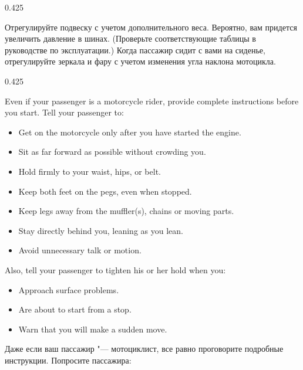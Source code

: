 \begin{langblock}{0.425}
\begin{rus}
		Отрегулируйте подвеску с учетом дополнительного веса. Вероятно, вам придется увеличить давление в шинах. (Проверьте соответствующие таблицы в руководстве по эксплуатации.) Когда пассажир сидит с вами на сиденье, отрегулируйте зеркала и фару с учетом изменения угла наклона мотоцикла.
\end{rus}
\end{langblock}






\begin{langblock}{0.425}
	\begin{eng}
	
	Even if your passenger is a motorcycle rider, provide complete instructions before you start. Tell your passenger to:	
	\begin{itemize}[noitemsep, nosep]
		\item Get on the motorcycle only after you have started the engine.
		\item Sit as far forward as possible without crowding you.
		\item Hold firmly to your waist, hips, or belt.
		\item Keep both feet on the pegs, even when stopped.
		\item Keep legs away from the muffler(s), chains or moving parts.
		\item Stay directly behind you, leaning as you lean.
		\item Avoid unnecessary talk or motion.  
	\end{itemize}	
	
	\medskip
	Also, tell your passenger to tighten his or her hold when you:
	\begin{itemize}[noitemsep, nosep]
		\item Approach surface problems.
		\item Are about to start from a stop.
		\item Warn that you will make a sudden move.
	\end{itemize}
	\end{eng}
	\begin{rus}
		
		Даже если ваш пассажир "--- мотоциклист, все равно проговорите подробные инструкции. Попросите пассажира:
		

\end{rus}
\end{langblock}
